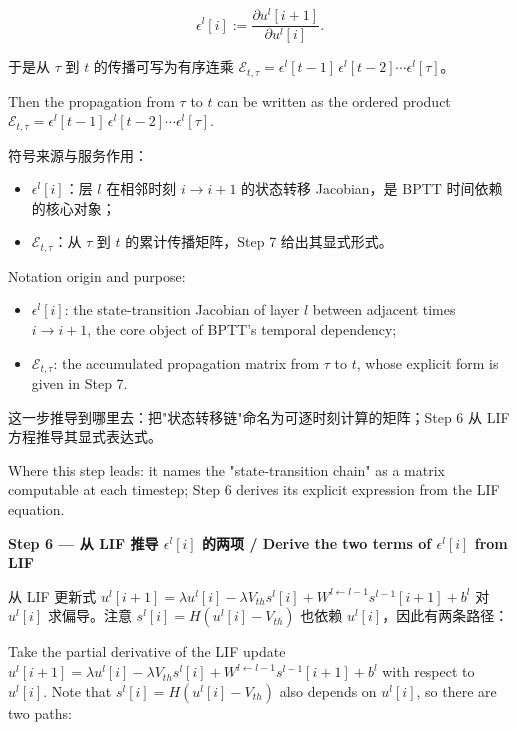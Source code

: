 \documentclass[journal,12pt,onecolumn]{IEEEtran}
\begin{document}
\begin{equation}
\epsilon^l[i] := \frac{\partial u^l[i+1]}{\partial u^l[i]}.
\end{equation}

于是从 $\tau$ 到 $t$ 的传播可写为有序连乘 $\mathcal{E}_{t,\tau} = \epsilon^l[t-1]\,\epsilon^l[t-2]\cdots\epsilon^l[\tau]$。

Then the propagation from $\tau$ to $t$ can be written as the ordered product $\mathcal{E}_{t,\tau} = \epsilon^l[t-1]\,\epsilon^l[t-2]\cdots\epsilon^l[\tau]$.

符号来源与服务作用：
\begin{itemize}[leftmargin=1.5em,itemsep=2pt]
\item $\epsilon^l[i]$：层 $l$ 在相邻时刻 $i\to i+1$ 的状态转移 Jacobian，是 BPTT 时间依赖的核心对象；
\item $\mathcal{E}_{t,\tau}$：从 $\tau$ 到 $t$ 的累计传播矩阵，Step 7 给出其显式形式。
\end{itemize}

Notation origin and purpose:
\begin{itemize}[leftmargin=1.5em,itemsep=2pt]
\item $\epsilon^l[i]$: the state-transition Jacobian of layer $l$ between adjacent times $i\to i+1$, the core object of BPTT's temporal dependency;
\item $\mathcal{E}_{t,\tau}$: the accumulated propagation matrix from $\tau$ to $t$, whose explicit form is given in Step 7.
\end{itemize}

这一步推导到哪里去：把"状态转移链"命名为可逐时刻计算的矩阵；Step 6 从 LIF 方程推导其显式表达式。

Where this step leads: it names the "state-transition chain" as a matrix computable at each timestep; Step 6 derives its explicit expression from the LIF equation.

\medskip\noindent\textbf{Step 6 — 从 LIF 推导 $\epsilon^l[i]$ 的两项 / Derive the two terms of $\epsilon^l[i]$ from LIF}

从 LIF 更新式 $u^l[i+1] = \lambda u^l[i] - \lambda V_{th} s^l[i] + W^{l\leftarrow l-1} s^{l-1}[i+1] + b^l$ 对 $u^l[i]$ 求偏导。注意 $s^l[i]=H(u^l[i]-V_{th})$ 也依赖 $u^l[i]$，因此有两条路径：

Take the partial derivative of the LIF update $u^l[i+1] = \lambda u^l[i] - \lambda V_{th} s^l[i] + W^{l\leftarrow l-1} s^{l-1}[i+1] + b^l$ with respect to $u^l[i]$. Note that $s^l[i]=H(u^l[i]-V_{th})$ also depends on $u^l[i]$, so there are two paths:
\end{document}
